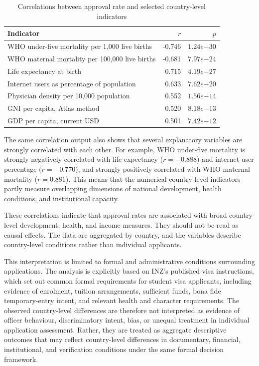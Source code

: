 \documentclass[runningheads]{llncs}
\begin{document}
\begin{table}
\caption{Correlations between approval rate and selected country-level indicators}
\label{tab:approval-country-correlations}
\centering
\renewcommand{\arraystretch}{1.25}
\setlength{\tabcolsep}{8pt}
\begin{tabular}{lrr}
\hline
Indicator & $r$ & $p$ \\
\hline
WHO under-five mortality per 1,000 live births & -0.746 & $1.24e{-30}$ \\
WHO maternal mortality per 100,000 live births & -0.681 & $7.97e{-24}$ \\
Life expectancy at birth & 0.715 & $4.19e{-27}$ \\
Internet users as percentage of population & 0.633 & $7.62e{-20}$ \\
Physician density per 10,000 population & 0.552 & $1.56e{-14}$ \\
GNI per capita, Atlas method & 0.520 & $8.18e{-13}$ \\
GDP per capita, current USD & 0.501 & $7.42e{-12}$ \\
\hline
\end{tabular}
\end{table}

The same correlation output also shows that several explanatory variables are strongly correlated with each other. For example, WHO under-five mortality is strongly negatively correlated with life expectancy ($r = -0.888$) and internet-user percentage ($r = -0.770$), and strongly positively correlated with WHO maternal mortality ($r = 0.881$). This means that the numerical country-level indicators partly measure overlapping dimensions of national development, health conditions, and institutional capacity.

These correlations indicate that approval rates are associated with broad country-level development, health, and income measures. They should not be read as causal effects. The data are aggregated by country, and the variables describe country-level conditions rather than individual applicants.

This interpretation is limited to formal and administrative conditions surrounding applications. The analysis is explicitly based on INZ's published visa instructions, which set out common formal requirements for student visa applicants, including evidence of enrolment, tuition arrangements, sufficient funds, bona fide temporary-entry intent, and relevant health and character requirements. The observed country-level differences are therefore not interpreted as evidence of officer behaviour, discriminatory intent, bias, or unequal treatment in individual application assessment. Rather, they are treated as aggregate descriptive outcomes that may reflect country-level differences in documentary, financial, institutional, and verification conditions under the same formal decision framework.
\end{document}
